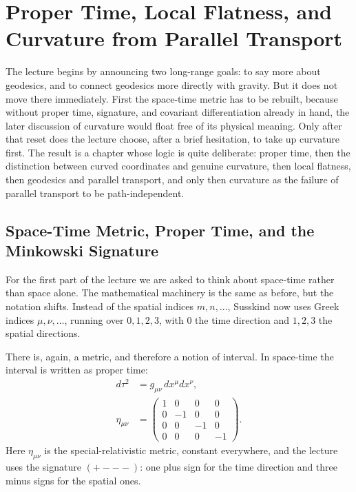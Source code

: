 \chapter{Proper Time, Local Flatness, and Curvature from Parallel Transport}

The lecture begins by announcing two long-range goals: to say more about geodesics, and to connect geodesics more directly with gravity. But it does not move there immediately. First the space-time metric has to be rebuilt, because without proper time, signature, and covariant differentiation already in hand, the later discussion of curvature would float free of its physical meaning. Only after that reset does the lecture choose, after a brief hesitation, to take up curvature first. The result is a chapter whose logic is quite deliberate: proper time, then the distinction between curved coordinates and genuine curvature, then local flatness, then geodesics and parallel transport, and only then curvature as the failure of parallel transport to be path-independent.

\section{Space-Time Metric, Proper Time, and the Minkowski Signature}

For the first part of the lecture we are asked to think about space-time rather than space alone. The mathematical machinery is the same as before, but the notation shifts. Instead of the spatial indices \(m,n,\ldots\), Susskind now uses Greek indices \(\mu,\nu,\ldots\), running over \(0,1,2,3\), with \(0\) the time direction and \(1,2,3\) the spatial directions.

There is, again, a metric, and therefore a notion of interval. In space-time the interval is written as proper time:
\begin{align}
d\tau^{2} &= g_{\mu\nu}\,dx^{\mu}dx^{\nu}, \\
\eta_{\mu\nu} &=
\begin{pmatrix}
1 & 0 & 0 & 0 \\
0 & -1 & 0 & 0 \\
0 & 0 & -1 & 0 \\
0 & 0 & 0 & -1
\end{pmatrix}.
\end{align}
Here \(\eta_{\mu\nu}\) is the special-relativistic metric, constant everywhere, and the lecture uses the signature \((+---)\): one plus sign for the time direction and three minus signs for the spatial ones.

